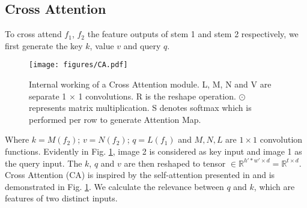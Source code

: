 \documentclass[a4paper,conference]{IEEEtran}
\begin{document}
\subsection{Cross Attention}

To cross attend $f_1$, $f_2$ the feature outputs of stem 1 and stem 2 respectively, we first generate the key $k$, value $v$ and query $q$.
\begin{figure}[!htb]
\begin{center}
\texttt{[image: figures/CA.pdf]}
\caption{\label{fig:cross_attention} Internal working of a Cross Attention module. L, M, N and V are separate 1 $\times$ 1 convolutions. R is the reshape operation. $\odot$ represents matrix multiplication. S denotes softmax which is performed per row to generate Attention Map.} 
\end{center}
\end{figure}Where $k = M(f_2)$; $v = N(f_2)$; $q = L(f_1)$ and $M,N,L$ are $1 \times 1$ convolution functions. Evidently in Fig. \ref{fig:cross_attention}, image 2 is considered as key input and image 1 as the query input.
The $k$, $q$ and $v$ are then reshaped to tensor $\in \mathbb{R}^{h' * w' \times d} = \mathbb{R}^{t \times d}$. Cross Attention (CA) is inspired by the self-attention presented in \cite{zhang_self-attention_2019} and is demonstrated in Fig. \ref{fig:cross_attention}. We calculate the relevance between $q$ and $k$, which are features of two distinct inputs. 
\end{document}
